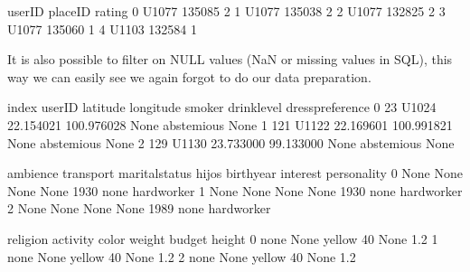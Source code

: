 \documentclass[letterpaper,10pt,english]{jupyterBook}
\begin{document}
\begin{sphinxVerbatim}[commandchars=\\\{\}]
  
\end{sphinxVerbatim}

\begin{sphinxVerbatim}[commandchars=\\\{\}]
  userID  placeID  rating
0  U1077   135085       2
1  U1077   135038       2
2  U1077   132825       2
3  U1077   135060       1
4  U1103   132584       1
\end{sphinxVerbatim}

\sphinxAtStartPar
It is also possible to filter on NULL values (NaN or missing values in SQL), this way we can easily see we again forgot to do our data preparation.

\begin{sphinxVerbatim}[commandchars=\\\{\}]
  
\end{sphinxVerbatim}

\begin{sphinxVerbatim}[commandchars=\\\{\}]
   index userID   latitude   longitude smoker drink\PYGZus{}level dress\PYGZus{}preference  \PYGZbs{}
0     23  U1024  22.154021 \PYGZhy{}100.976028   None  abstemious             None   
1    121  U1122  22.169601 \PYGZhy{}100.991821   None  abstemious             None   
2    129  U1130  23.733000  \PYGZhy{}99.133000   None  abstemious             None   

  ambience transport marital\PYGZus{}status hijos  birth\PYGZus{}year interest  personality  \PYGZbs{}
0     None      None           None  None        1930     none  hard\PYGZhy{}worker   
1     None      None           None  None        1930     none  hard\PYGZhy{}worker   
2     None      None           None  None        1989     none  hard\PYGZhy{}worker   

  religion activity   color  weight budget  height  
0     none     None  yellow      40   None     1.2  
1     none     None  yellow      40   None     1.2  
2     none     None  yellow      40   None     1.2  
\end{sphinxVerbatim}
\end{document}
